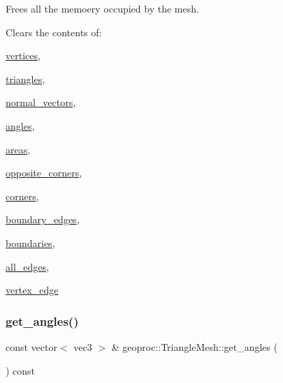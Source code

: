Frees all the memoery occupied by the mesh. 

Clears the contents of\+:
\begin{DoxyItemize}
\item \hyperlink{classgeoproc_1_1TriangleMesh_a82c3351de37daa9440f53597f080992d}{vertices},
\item \hyperlink{classgeoproc_1_1TriangleMesh_ad1cf20622f2bb080100862f413bd89c2}{triangles},
\item \hyperlink{classgeoproc_1_1TriangleMesh_ab9030a0301b2fe5868ad6c08692cce09}{normal\+\_\+vectors},
\item \hyperlink{classgeoproc_1_1TriangleMesh_ab255af87d20d76ad84246560fa3579b3}{angles},
\item \hyperlink{classgeoproc_1_1TriangleMesh_a684ecaaa03f1739856bba03167e51dd1}{areas},
\item \hyperlink{classgeoproc_1_1TriangleMesh_a2604795c90c694116513252b86d242b4}{opposite\+\_\+corners},
\item \hyperlink{classgeoproc_1_1TriangleMesh_ab9610d614e081deb28010d237fecd55b}{corners},
\item \hyperlink{classgeoproc_1_1TriangleMesh_a142a764ddf07b98c7efcd596d88c3f87}{boundary\+\_\+edges},
\item \hyperlink{classgeoproc_1_1TriangleMesh_a57162eac37831c87786a8dab8331d72f}{boundaries},
\item \hyperlink{classgeoproc_1_1TriangleMesh_ab10f052ad932cd78056a55b58ddd475c}{all\+\_\+edges},
\item \hyperlink{classgeoproc_1_1TriangleMesh_abbc25699f67776fc99c909124b0c584a}{vertex\+\_\+edge} 
\end{DoxyItemize}\mbox{\label{classgeoproc_1_1TriangleMesh_ae883c39c841c6598b0490224755f25b9}} 
\subsubsection{\texorpdfstring{get\+\_\+angles()}{get\_angles()}}
{\footnotesize\ttfamily const vector$<$ vec3 $>$ \& geoproc\+::\+Triangle\+Mesh\+::get\+\_\+angles (\begin{DoxyParamCaption}{ }\end{DoxyParamCaption}) const}



